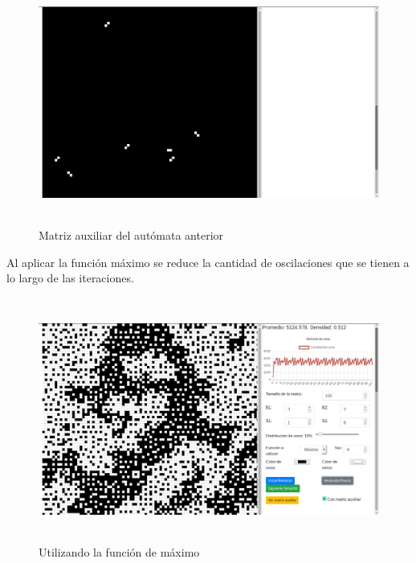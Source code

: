 \documentclass[12pt, titlepage]{article}
\begin{document}
\begin{figure}[H]
\begin{center}
 \includegraphics[width=15cm, height=8cm]{./img/3318-min-aux.png}
 \caption{Matriz auxiliar del autómata anterior}
 \label{fig:3318-min-aux}
\end{center}
\end{figure}
Al aplicar la función máximo se reduce la cantidad de oscilaciones que se tienen a lo largo de las iteraciones.
\begin{figure}[H]
\begin{center}
 \includegraphics[width=15cm, height=8cm]{./img/3318-max.png}
 \caption{Utilizando la función de máximo}
 \label{fig:3318-max}
\end{center}
\end{figure}
\end{document}
